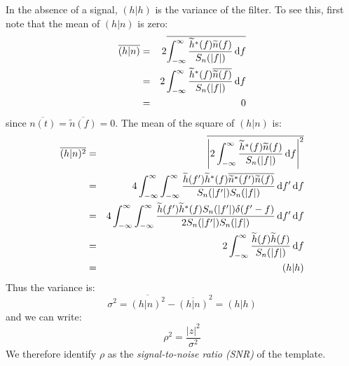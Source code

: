 In the absence of a signal, $(h|h)$ is the variance of the filter. To see this, first note that the mean of $(h|n)$ is zero:
\begin{eqnarray}
\overline{(h|n)} & = & 2 \overline{\int_{-\infty}^{\infty} \frac{\widetilde{h}^{*}(f)\widetilde{n}(f)}{S_n(|f|)} \,\mathrm{d} f} \nonumber \\
 & = & 2 \int_{-\infty}^{\infty} \frac{\widetilde{h}^{*}(f)\overline{\widetilde{n}(f)}}{S_n(|f|)} \,\mathrm{d} f \nonumber \\
 & = & 0
\end{eqnarray}
since $\overline{n(t)} = \overline{\widetilde{n}(f)} = 0$. The mean of the square of $(h|n)$ is:
\begin{eqnarray}
\overline{(h|n)^2} & = & \overline{\left| 2 \int_{-\infty}^{\infty} \frac{\widetilde{h}^{*}(f)\widetilde{n}(f)}{S_n(|f|)} \,\mathrm{d} f \right|^2 } \nonumber \\
 & = & 4 \int_{-\infty}^{\infty} \int_{-\infty}^{\infty} \frac{\widetilde{h}(f')\widetilde{h}^{*}(f)\overline{\widetilde{n}^{*}(f')\widetilde{n}(f)}}{S_n(|f'|)S_n(|f|)} \,\mathrm{d} f' \,\mathrm{d} f \nonumber \\
 & = & 4 \int_{-\infty}^{\infty} \int_{-\infty}^{\infty} \frac{\widetilde{h}(f')\widetilde{h}^{*}(f) S_n(|f'|)\delta(f'-f)}{2 S_n(|f'|)S_n(|f|)} \,\mathrm{d} f' \,\mathrm{d} f \nonumber \\
 & = & 2 \int_{-\infty}^{\infty} \frac{\widetilde{h}(f)\widetilde{h}(f)}{S_n(|f|)} \,\mathrm{d} f \nonumber \\
 & = & (h|h)
\end{eqnarray}
Thus the variance is:
\begin{equation}
\sigma^2 = \overline{(h|n)^2} - \overline{(h|n)}^2 = (h|h)
\end{equation}
and we can write:
\begin{equation}
\label{eqn:SNR}
\rho^2 = \frac{|z|^2}{\sigma^2}
\end{equation}
We therefore identify $\rho$ as the \emph{signal-to-noise ratio (SNR)} of the template.

